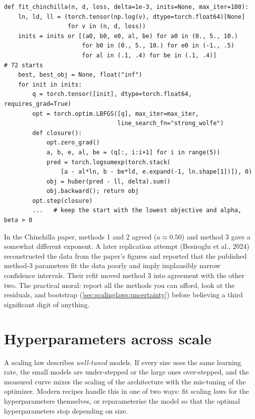 \begin{lstlisting}[caption={Huber/LSE fit of the parametric law from a grid of starts (from \code{llmsys/scaling.py}).},label={lst:scalinglaws:chin}]
def fit_chinchilla(n, d, loss, delta=1e-3, inits=None, max_iter=100):
    ln, ld, ll = (torch.tensor(np.log(v), dtype=torch.float64)[None]
                  for v in (n, d, loss))
    inits = inits or [(a0, b0, e0, al, be) for a0 in (0., 5., 10.)
                      for b0 in (0., 5., 10.) for e0 in (-1., .5)
                      for al in (.1, .4) for be in (.1, .4)]          # 72 starts
    best, best_obj = None, float("inf")
    for init in inits:
        q = torch.tensor([init], dtype=torch.float64, requires_grad=True)
        opt = torch.optim.LBFGS([q], max_iter=max_iter,
                                line_search_fn="strong_wolfe")
        def closure():
            opt.zero_grad()
            a, b, e, al, be = (q[:, i:i+1] for i in range(5))
            pred = torch.logsumexp(torch.stack(
                [a - al*ln, b - be*ld, e.expand(-1, ln.shape[1])]), 0)
            obj = huber(pred - ll, delta).sum()
            obj.backward(); return obj
        opt.step(closure)
        ...   # keep the start with the lowest objective and alpha, beta > 0
\end{lstlisting}

\begin{deepdive}
In the Chinchilla paper, methods 1 and 2 agreed ($a\approx0.50$) and method 3 gave a somewhat
different exponent. A later replication attempt (Besiroglu et al., 2024) reconstructed the data
from the paper's figures and reported that the published method-3 parameters fit the data
poorly and imply implausibly narrow confidence intervals. Their refit moved method 3 into
agreement with the other two. The practical moral: report all the methods you can afford, look
at the residuals, and bootstrap (\cref{sec:scalinglaws:uncertainty}) before believing a third
significant digit of anything.
\end{deepdive}

\section{Hyperparameters across scale}\label{sec:scalinglaws:hparams}

A scaling law describes \emph{well-tuned} models. If every size uses the same learning rate,
the small models are under-stepped or the large ones over-stepped, and the measured curve
mixes the scaling of the architecture with the mis-tuning of the optimizer. Modern recipes
handle this in one of two ways: fit scaling laws for the hyperparameters themselves, or
reparameterise the model so that the optimal hyperparameters stop depending on size.

